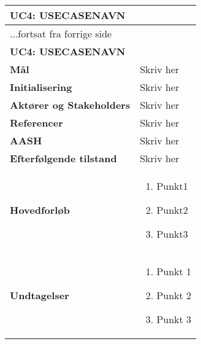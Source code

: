 \begin{center} \centering \label{kravspec:uc4}
	\begin{longtable}{|p{5cm}|p{9cm}|}  %
	\hline
		\multicolumn{2}{|l|}{\textbf{UC4: USECASENAVN}} \\\hline %
		\endfirsthead
		
		\multicolumn{2}{l}{...fortsat fra forrige side} \\ \hline %
		\multicolumn{2}{|l|}{\textbf{UC4: USECASENAVN}} \\\hline %
		\endhead	
		
		\textbf{Mål}							&Skriv her		\\\hline
		\textbf{Initialisering}				&Skriv her		\\\hline
		\textbf{Aktører og Stakeholders}		&Skriv her		\\\hline 
		\textbf{Referencer}					&Skriv her		\\\hline
		\textbf{AASH}						&Skriv her		\\\hline
		\textbf{Efterfølgende tilstand}		&Skriv her		\\\hline
		\textbf{Hovedforløb}					
			&\begin{enumerate}
	
				\item Punkt1
				
				\item Punkt2				
				
				\item Punkt3
				
			\end{enumerate}
		\\\hline
		\textbf{Undtagelser}
			&\begin{enumerate}
			
				\item Punkt 1

				\item Punkt 2
				
				\item Punkt 3

			\end{enumerate}
		\\\hline
	\end{longtable} 
\end{center}

